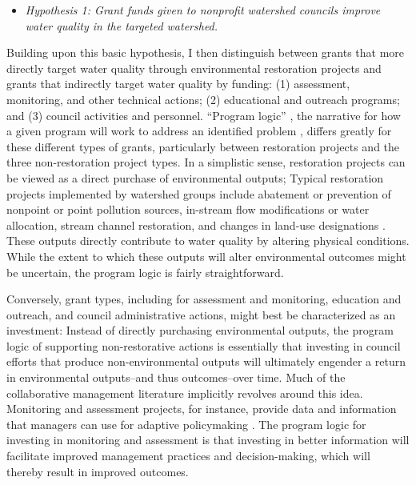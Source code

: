 \documentclass[11pt,a4paper,titlepage]{article}
\begin{document}
\begin{itemize}
\item \textit{Hypothesis 1: Grant funds given to nonprofit watershed councils improve water quality in the targeted watershed.}
\end{itemize}

Building upon this basic hypothesis, I then distinguish between grants that more directly target water quality through environmental restoration projects and grants that indirectly target water quality by funding: (1) assessment, monitoring, and other technical actions; (2) educational and outreach programs; and (3) council activities and personnel. “Program logic” \parencite{bickman1987}, the narrative for how a given program will work to address an identified problem \parencite{margerum2011,mclaughlin1999}, differs greatly for these different types of grants, particularly between restoration projects and the three non-restoration project types. In a simplistic sense, restoration projects can be viewed as a direct purchase of environmental outputs; Typical restoration projects implemented by watershed groups include abatement or prevention of nonpoint or point pollution sources, in-stream flow modifications or water allocation, stream channel restoration, and changes in land-use designations \parencite{leach2002}. These outputs directly contribute to water quality by altering physical conditions. While the extent to which these outputs will alter environmental outcomes might be uncertain, the program logic is fairly straightforward.

Conversely, grant types, including for assessment and monitoring, education and outreach, and council administrative actions, might best be characterized as an investment: Instead of directly purchasing environmental outputs, the program logic of supporting non-restorative actions is essentially that investing in council efforts that produce non-environmental outputs will ultimately engender a return in environmental outputs--and thus outcomes--over time. Much of the collaborative management literature implicitly revolves around this idea. Monitoring and assessment projects, for instance, provide data and information that managers can use for adaptive policymaking \parencite{huntington2000, leach2002,yaffee1996}. The program logic for investing in monitoring and assessment is that investing in better information will facilitate improved management practices and decision-making, which will thereby result in improved outcomes. 
\end{document}
